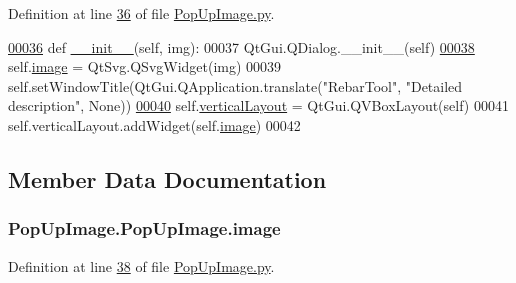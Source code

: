 Definition at line \hyperlink{PopUpImage_8py_source_l00036}{36} of file \hyperlink{PopUpImage_8py_source}{Pop\+Up\+Image.\+py}.


\begin{DoxyCode}
\hypertarget{classPopUpImage_1_1PopUpImage.tex_l00036}{}\hyperlink{classPopUpImage_1_1PopUpImage_ab5762e645d43ced84b3e70f61c55d25e}{00036}    \textcolor{keyword}{def }\hyperlink{classPopUpImage_1_1PopUpImage_ab5762e645d43ced84b3e70f61c55d25e}{\_\_init\_\_}(self, img):
00037         QtGui.QDialog.\_\_init\_\_(self)
\hypertarget{classPopUpImage_1_1PopUpImage.tex_l00038}{}\hyperlink{classPopUpImage_1_1PopUpImage_a21575164e7b7cc253fd11937f3aa0466}{00038}         self.\hyperlink{classPopUpImage_1_1PopUpImage_a21575164e7b7cc253fd11937f3aa0466}{image} = QtSvg.QSvgWidget(img)
00039         self.setWindowTitle(QtGui.QApplication.translate(\textcolor{stringliteral}{"RebarTool"}, \textcolor{stringliteral}{"Detailed description"}, \textcolor{keywordtype}{None}))
\hypertarget{classPopUpImage_1_1PopUpImage.tex_l00040}{}\hyperlink{classPopUpImage_1_1PopUpImage_a2bacc8ca805321016053553bc3b27a20}{00040}         self.\hyperlink{classPopUpImage_1_1PopUpImage_a2bacc8ca805321016053553bc3b27a20}{verticalLayout} = QtGui.QVBoxLayout(self)
00041         self.verticalLayout.addWidget(self.\hyperlink{classPopUpImage_1_1PopUpImage_a21575164e7b7cc253fd11937f3aa0466}{image})
00042 
\end{DoxyCode}


\subsection{Member Data Documentation}
\subsubsection[{\texorpdfstring{image}{image}}]{\setlength{\rightskip}{0pt plus 5cm}Pop\+Up\+Image.\+Pop\+Up\+Image.\+image}\hypertarget{classPopUpImage_1_1PopUpImage_a21575164e7b7cc253fd11937f3aa0466}{}\label{classPopUpImage_1_1PopUpImage_a21575164e7b7cc253fd11937f3aa0466}


Definition at line \hyperlink{PopUpImage_8py_source_l00038}{38} of file \hyperlink{PopUpImage_8py_source}{Pop\+Up\+Image.\+py}.

